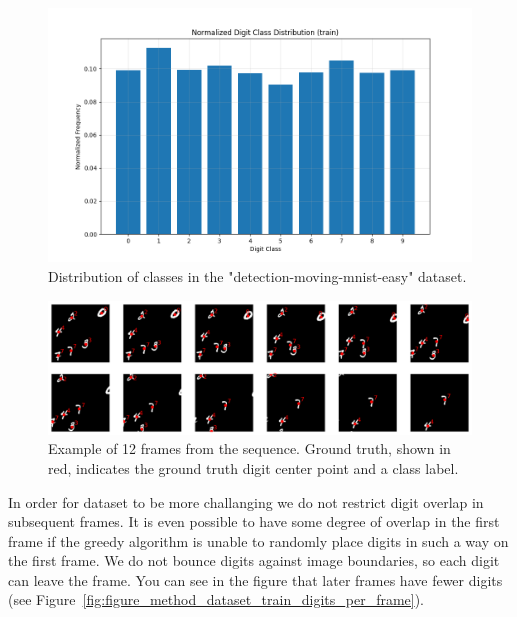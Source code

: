\begin{figure}
    \centering
    \includegraphics[width=\textwidth]{figures/figure_method_dataset_train_digit_classes.png}
    \caption{Distribution of classes in the "detection-moving-mnist-easy" dataset.}
    \label{fig:figure_method_dataset_train_digit_classes}
\end{figure}


\begin{figure}
    \centering
    \includegraphics[width=\textwidth]{figures/figure_methods_dataset_detection_mmnist_sequence.png}
    \caption{Example of 12 frames from the sequence. Ground truth, shown in red, indicates the ground truth digit center point and a class label.}
    \label{fig:figure_methods_dataset_detection_mmnist_sequence}
\end{figure}


In order for dataset to be more challanging we do not restrict digit overlap in subsequent frames. It is even possible to have some degree of overlap in the first frame if the greedy algorithm is unable to randomly place digits in such a way on the first frame. We do not bounce digits against image boundaries, so each digit can leave the frame. You can see in the figure that later frames have fewer digits (see Figure~\ref{fig:figure_method_dataset_train_digits_per_frame}).

